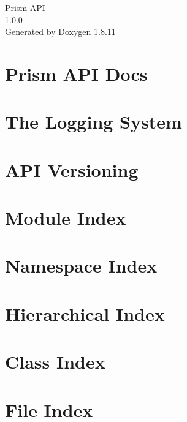 \documentclass[twoside]{book}
\newcommand{\+}{\discretionary{\mbox{\scriptsize$\hookleftarrow$}}{}{}}
\newcommand{\clearemptydoublepage}{%
  \newpage{\pagestyle{empty}\cleardoublepage}%
}
\begin{document}
\hypersetup{pageanchor=false,
             bookmarksnumbered=true,
             pdfencoding=unicode
            }
\begin{titlepage}
\vspace*{7cm}
\begin{center}%
{\Large Prism A\+PI \\[1ex]\large 1.\+0.\+0 }\\
\vspace*{1cm}
{\large Generated by Doxygen 1.8.11}\\
\end{center}
\end{titlepage}
\clearemptydoublepage
\tableofcontents
\clearemptydoublepage
{}
\hypersetup{pageanchor=true}

\chapter{Prism A\+PI Docs}
\label{index}\hypertarget{index}{}
\chapter{The Logging System}
\label{page_Logging}
\hypertarget{page_Logging}{}

\chapter{A\+PI Versioning}
\label{page_Versioning}
\hypertarget{page_Versioning}{}

\chapter{Module Index}

\chapter{Namespace Index}

\chapter{Hierarchical Index}

\chapter{Class Index}

\chapter{File Index}

\end{document}
